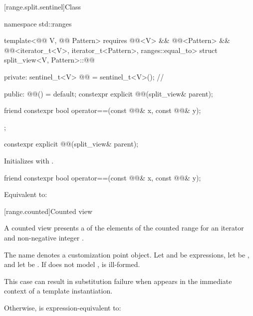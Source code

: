 [range.split.sentinel]{Class }

\begin{codeblock}
namespace std::ranges {
  template<@@ V, @@ Pattern>
    requires @@<V> && @@<Pattern> &&
             @@<iterator_t<V>, iterator_t<Pattern>, ranges::equal_to>
  struct split_view<V, Pattern>::@@ {
  private:
    sentinel_t<V> @@ = sentinel_t<V>();               // \expos

  public:
    @@() = default;
    constexpr explicit @@(split_view& parent);

    friend constexpr bool operator==(const @@& x, const @@& y);
  };
}
\end{codeblock}

\begin{itemdecl}
constexpr explicit @@(split_view& parent);
\end{itemdecl}

\begin{itemdescr}
\pnum
\effects
Initializes  with .
\end{itemdescr}

\begin{itemdecl}
friend constexpr bool operator==(const @@& x, const @@& y);
\end{itemdecl}

\begin{itemdescr}
\pnum
\effects
Equivalent to: 
\end{itemdescr}

[range.counted]{Counted view}

\pnum
{}%
A counted view presents a  of the elements
of the counted range 
for an iterator  and non-negative integer .

\pnum
{}%
The name  denotes
a customization point object.
Let  and  be expressions,
let  be , and
let  be .
If  does not model
,
 is ill-formed.
\begin{note}
This case can result in substitution failure
when 
appears in the immediate context of a template instantiation.
\end{note}
Otherwise, 
is expression-equivalent to:

